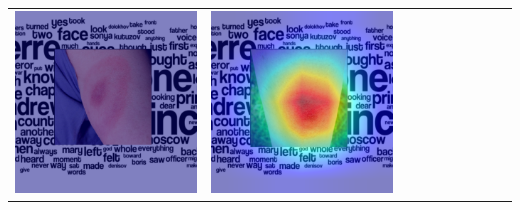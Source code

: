 \begin{landscape}
\begin{table}[]
\begin{tabular}{@{}c c c c c c c c c c@{}}
			\includegraphics[width=.12\textheight ,keepaspectratio]{images/pretraining/gradcam/3/ResNet101CombinedGradCam.png} &
			\includegraphics[width=.12\textheight ,keepaspectratio]{images/pretraining/gradcam/9/ResNet101CombinedGradCam.png} &

\end{tabular}
\end{table}
\end{landscape}
